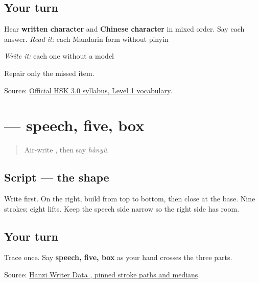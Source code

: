 \subsection*{Your turn}
Hear \textbf{written character} and \textbf{Chinese character} in mixed order. Say each answer. \emph{Read it:} each Mandarin form without pinyin

\emph{Write it:} each one without a model

Repair only the missed item.

\begin{tcolorbox}[breakable,colback=teal!4,colframe=teal!35!black,title={Before you move on}]
Source: \href{https://hsk.cn-bj.ufileos.com/3.0/\%E6\%96\%B0\%E7\%89\%88HSK\%E8\%80\%83\%E8\%AF\%95\%E5\%A4\%A7\%E7\%BA\%B21219.pdf}{Official HSK 3.0 syllabus, Level 1 vocabulary}.
\end{tcolorbox}
\section[\texorpdfstring{\zh{语} (yǔ)}{语 (yǔ)}]{ — speech, five, box}

\label{lesson:ZH-W16-yu-observe}



\begin{quote}
Air-write , then say \emph{hànyǔ}.
\end{quote}

\subsection*{Script — the shape}

Write \textbf{} first. On the right, build \textbf{} from top to bottom, then close \textbf{} at the base. Nine strokes; eight lifts. Keep the speech side narrow so the right side has room.

\subsection*{Your turn}
Trace \textbf{} once. Say \textbf{speech, five, box} as your hand crosses the three parts.

\begin{tcolorbox}[breakable,colback=teal!4,colframe=teal!35!black,title={Before you move on}]
Source: \href{https://raw.githubusercontent.com/chanind/hanzi-writer-data/68d10a4b21150cae5e1ebbd223eed289cf32d90c/data/\%E8\%AF\%AD.json}{Hanzi Writer Data , pinned stroke paths and medians}.
\end{tcolorbox}

